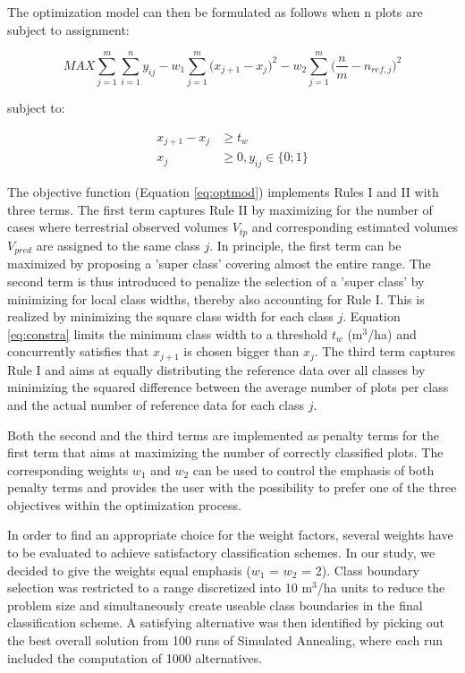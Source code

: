 The optimization model can then be formulated as follows when n plots are subject to assignment:

\begin{equation}\label{eq:optmod}
MAX \sum_{j=1}^{m} \sum_{i=1}^{n} y_{ij} - w_1 \sum_{j=1}^{m}\big(x_{j+1}-x_j\big)^2 - w_2 \sum_{j=1}^{m} \big(\frac{n}{m} - n_{ref,j}\big)^2
\end{equation}

subject to:

\begin{subequations}\label{eq:constr}
	\begin{align}
	x_{j+1}-x_j & \geq t_w \label{eq:constra} \\
	x_j & \geq 0, y_{ij} \in \{0;1\} \label{eq:constrb}
	\end{align}
\end{subequations}

The objective function (Equation \ref{eq:optmod}) implements Rules I and II with three terms. The first term captures Rule II by maximizing for the number of cases where terrestrial observed volumes $V_{tp}$  and corresponding estimated volumes $V_{pred}$ are assigned to the same class $j$. In principle, the first term can be maximized by proposing a 'super class' covering almost the entire range. The second term is thus introduced to penalize the selection of a 'super class' by minimizing for local class widths, thereby also accounting for Rule I. This is realized by minimizing the square class width for each class $j$. Equation \ref{eq:constra} limits the minimum class width to a threshold $t_w$ (m$^3$/ha) and concurrently satisfies that $x_{j+1}$ is chosen bigger than $x_j$. The third term captures Rule I and aims at equally distributing the reference data over all classes by minimizing the squared difference between the average number of plots per class and the actual number of reference data for each class $j$.\par
Both the second and the third terms are implemented as penalty terms for the first term that aims at maximizing the number of correctly classified plots. The corresponding weights $w_1$ and $w_2$ can be used to control the emphasis of both penalty terms and provides the user with the possibility to prefer one of the three objectives within the optimization process.\par
In order to find an appropriate choice for the weight factors, several weights have to be evaluated to achieve satisfactory classification schemes. In our study, we decided to give the weights equal emphasis ($w_1$ = $w_2$ = 2). Class boundary selection was restricted to a range discretized into 10 m$^3$/ha units to reduce the problem size and simultaneously create useable class boundaries in the final classification scheme. A satisfying alternative was then identified by picking out the best overall solution from 100 runs of Simulated Annealing, where each run included the computation of 1000 alternatives.


